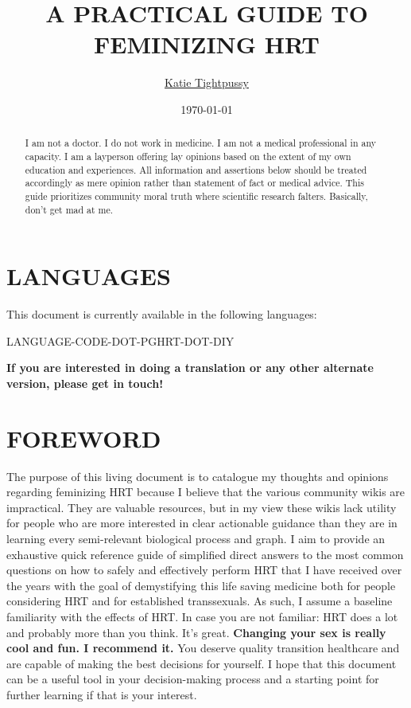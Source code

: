 \documentclass{article}
\title{A PRACTICAL GUIDE TO FEMINIZING HRT}
\author{\href{https://katea.gay/}{Katie Tightpussy}}
\date{\today}
\begin{document}
\maketitle
\tableofcontents
\begin{abstract}
  I am not a doctor. I do not work in medicine. I am not a medical professional in any capacity. I am a layperson offering lay opinions based on the extent of my own education and experiences. All information and assertions below should be treated accordingly as mere opinion rather than statement of fact or medical advice. This guide prioritizes community moral truth where scientific research falters. Basically, don’t get mad at me.
\end{abstract}

\section*{LANGUAGES}

This document is currently available in the following languages:

LANGUAGE-CODE-DOT-PGHRT-DOT-DIY

\noindent\textbf{If you are interested in doing a translation or any other alternate version, please get in touch!}



\section{FOREWORD}

The purpose of this living document is to catalogue my thoughts and opinions regarding feminizing HRT because I believe that the various community wikis are impractical. They are valuable resources, but in my view these wikis lack utility for people who are more interested in clear actionable guidance than they are in learning every semi-relevant biological process and graph. I aim to provide an exhaustive quick reference guide of simplified direct answers to the most common questions on how to safely and effectively perform HRT that I have received over the years with the goal of demystifying this life saving medicine both for people considering HRT and for established transsexuals. As such, I assume a baseline familiarity with the effects of HRT. In case you are not familiar: HRT does a lot and probably more than you think. It’s great. \textbf{Changing your sex is really cool and fun. I recommend it.} You deserve quality transition healthcare and are capable of making the best decisions for yourself. I hope that this document can be a useful tool in your decision-making process and a starting point for further learning if that is your interest.
\end{document}
